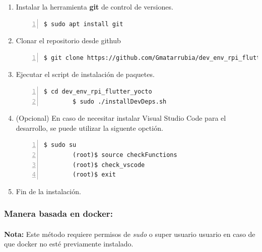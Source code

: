 \begin{enumerate}
    \item Instalar la herramienta \textbf{\gls{git}} de control de versiones.
    \begin{lstlisting}[style=consola, numbers=left]
        $ sudo apt install git
    \end{lstlisting}

    \item Clonar el repositorio desde github
    \begin{lstlisting}[style=consola, numbers=left]
        $ git clone https://github.com/Gmatarrubia/dev_env_rpi_flutter_yocto.git
    \end{lstlisting}

    \item Ejecutar el script de instalación de paquetes.
    \begin{lstlisting}[style=consola, numbers=left]
        $ cd dev_env_rpi_flutter_yocto
        $ sudo ./installDevDeps.sh
    \end{lstlisting}

    \item (Opcional) En caso de necesitar instalar Visual Studio Code para el desarrollo,
    se puede utilizar la siguente opctión.
    \begin{lstlisting}[style=consola, numbers=left]
        $ sudo su
        (root)$ source checkFunctions
        (root)$ check_vscode
        (root)$ exit
    \end{lstlisting}

    \item Fin de la instalación.
\end{enumerate}

\subsubsection{Manera basada en docker:}

\paragraph{}\textbf{Nota:} Este método requiere permisos de \emph{sudo} o super usuario
usuario en caso de que docker no esté previamente instalado.

